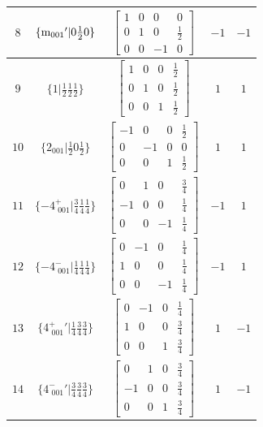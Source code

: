 \documentclass[fleqn,8pt]{jsarticle}
\begin{document}
\begin{longtable}{ccccc}
$ 8 $ & $ \{{\rm m}_{001}{}'|0 \frac{1}{2} 0\} $ & $ \begin{bmatrix} 1 & 0 & 0 & 0 \\ 0 & 1 & 0 & \frac{1}{2} \\ 0 & 0 & -1 & 0 \end{bmatrix} $ & $ -1 $ & $ -1 $ \\ \hline
$ 9 $ & $ \{1|\frac{1}{2} \frac{1}{2} \frac{1}{2}\} $ & $ \begin{bmatrix} 1 & 0 & 0 & \frac{1}{2} \\ 0 & 1 & 0 & \frac{1}{2} \\ 0 & 0 & 1 & \frac{1}{2} \end{bmatrix} $ & $ 1 $ & $ 1 $ \\ \hline
$ 10 $ & $ \{2{}_{001}|\frac{1}{2} 0 \frac{1}{2}\} $ & $ \begin{bmatrix} -1 & 0 & 0 & \frac{1}{2} \\ 0 & -1 & 0 & 0 \\ 0 & 0 & 1 & \frac{1}{2} \end{bmatrix} $ & $ 1 $ & $ 1 $ \\ \hline
$ 11 $ & $ \{-4^{+}_{\,\,001}|\frac{3}{4} \frac{1}{4} \frac{1}{4}\} $ & $ \begin{bmatrix} 0 & 1 & 0 & \frac{3}{4} \\ -1 & 0 & 0 & \frac{1}{4} \\ 0 & 0 & -1 & \frac{1}{4} \end{bmatrix} $ & $ -1 $ & $ 1 $ \\ \hline
$ 12 $ & $ \{-4^{-}_{\,\,001}|\frac{1}{4} \frac{1}{4} \frac{1}{4}\} $ & $ \begin{bmatrix} 0 & -1 & 0 & \frac{1}{4} \\ 1 & 0 & 0 & \frac{1}{4} \\ 0 & 0 & -1 & \frac{1}{4} \end{bmatrix} $ & $ -1 $ & $ 1 $ \\ \hline
$ 13 $ & $ \{4^{+}_{\,\,001}{}'|\frac{1}{4} \frac{3}{4} \frac{3}{4}\} $ & $ \begin{bmatrix} 0 & -1 & 0 & \frac{1}{4} \\ 1 & 0 & 0 & \frac{3}{4} \\ 0 & 0 & 1 & \frac{3}{4} \end{bmatrix} $ & $ 1 $ & $ -1 $ \\ \hline
$ 14 $ & $ \{4^{-}_{\,\,001}{}'|\frac{3}{4} \frac{3}{4} \frac{3}{4}\} $ & $ \begin{bmatrix} 0 & 1 & 0 & \frac{3}{4} \\ -1 & 0 & 0 & \frac{3}{4} \\ 0 & 0 & 1 & \frac{3}{4} \end{bmatrix} $ & $ 1 $ & $ -1 $ \\ \hline

\end{longtable}
\end{document}
